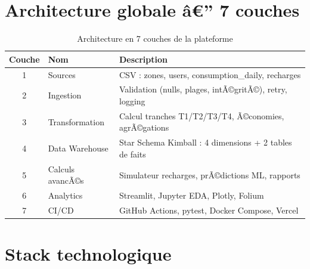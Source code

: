 \documentclass[12pt,a4paper]{report}
\begin{document}
\section{Architecture globale â€” 7 couches}

\begin{table}[h!]
\centering
\caption{Architecture en 7 couches de la plateforme}
\label{tab:couches}
\begin{tabularx}{\textwidth}{c l X}
\toprule
\rowcolor{marine!10}
Couche & Nom & Description \\
\midrule
1 & Sources         & CSV : zones, users, consumption\_daily, recharges \\
2 & Ingestion       & Validation (nulls, plages, intÃ©gritÃ©), retry, logging \\
3 & Transformation  & Calcul tranches T1/T2/T3/T4, Ã©conomies, agrÃ©gations \\
4 & Data Warehouse  & Star Schema Kimball : 4 dimensions + 2 tables de faits \\
5 & Calculs avancÃ©s & Simulateur recharges, prÃ©dictions ML, rapports \\
6 & Analytics       & Streamlit, Jupyter EDA, Plotly, Folium \\
7 & CI/CD           & GitHub Actions, pytest, Docker Compose, Vercel \\
\bottomrule
\end{tabularx}
\end{table}

\section{Stack technologique}
\end{document}

